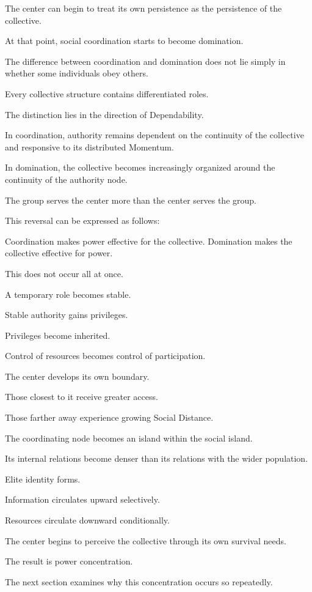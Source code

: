 The center can begin to treat its own persistence as the persistence of the collective.

At that point, social coordination starts to become domination.

The difference between coordination and domination does not lie simply in whether some individuals obey others.

Every collective structure contains differentiated roles.

The distinction lies in the direction of Dependability.

In coordination, authority remains dependent on the continuity of the collective and responsive to its distributed Momentum.

In domination, the collective becomes increasingly organized around the continuity of the authority node.

The group serves the center more than the center serves the group.

This reversal can be expressed as follows:

Coordination makes power effective for the collective. Domination makes the collective effective for power.

This does not occur all at once.

A temporary role becomes stable.

Stable authority gains privileges.

Privileges become inherited.

Control of resources becomes control of participation.

The center develops its own boundary.

Those closest to it receive greater access.

Those farther away experience growing Social Distance.

The coordinating node becomes an island within the social island.

Its internal relations become denser than its relations with the wider population.

Elite identity forms.

Information circulates upward selectively.

Resources circulate downward conditionally.

The center begins to perceive the collective through its own survival needs.

The result is power concentration.

The next section examines why this concentration occurs so repeatedly.

